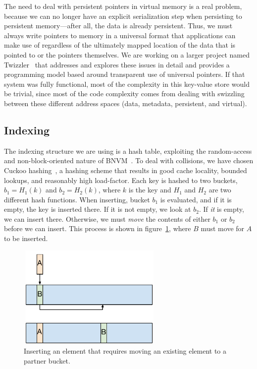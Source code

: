 The need to deal with persistent pointers in virtual memory is a real problem,
because we can no longer have an explicit serialization step when persisting to
persistent memory---after all, the data is already persistent. Thus, we must
always write pointers to memory in a universal format that applications can make
use of regardless of the ultimately mapped location of the data that is pointed
to or the pointers themselves. We are working on a larger project named
Twizzler~\cite{bittman-ssrctr-17-01} that addresses and explores these issues in
detail and provides a programming model based around transparent use of
universal pointers. If that system was fully functional, most of the complexity in this
key-value store would be trivial, since most of the code complexity comes from
dealing with swizzling between these different address spaces (data, metadata,
persistent, and virtual).


\subsection{Indexing}

The indexing structure we are using is a hash table, exploiting the
random-access and non-block-oriented nature of BNVM~\cite{Debnath:2016ht}. To
deal with collisions, we have chosen Cuckoo hashing~\cite{Pagh:2004}, a hashing
scheme that results in good cache locality, bounded lookups, and reasonably high
load-factor. Each key is hashed to two buckets, $b_1 = H_1(k)$ and $b_2 =
H_2(k)$, where $k$ is the key and $H_1$ and $H_2$ are two different hash
functions. When inserting, bucket $b_1$ is evaluated, and if it is empty, the
key is inserted there. If it is not empty, we look at $b_2$. If \textit{it} is
empty, we can insert there. Otherwise, we must \textit{move} the contents of
either $b_1$ or $b_2$ before we can insert. This process is shown in
figure~\ref{fig:insert}, where $B$ must move for $A$ to be inserted.

\begin{figure}
\centering
\includegraphics[width=70mm,height=50mm]{fig/cuckoo_insert}
\caption{Inserting an element that requires moving an existing element to a
partner bucket.}
\label{fig:insert}
\end{figure}



